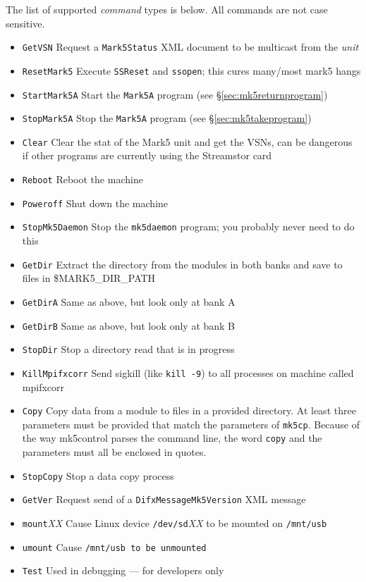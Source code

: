 The list of supported {\em command} types is below.
All commands are not case sensitive.
\begin{itemize}
\item {\tt GetVSN} Request a {\tt Mark5Status} XML document to be multicast from the {\em unit}
\item {\tt ResetMark5} Execute {\tt SSReset} and {\tt ssopen}; this cures many/most mark5 hangs
\item {\tt StartMark5A} Start the {\tt Mark5A} program (see \S\ref{sec:mk5returnprogram})
\item {\tt StopMark5A} Stop the {\tt Mark5A} program (see \S\ref{sec:mk5takeprogram})
\item {\tt Clear} Clear the stat of the Mark5 unit and get the VSNs, can be dangerous if other programs are currently using the Streamstor card
\item {\tt Reboot} Reboot the machine
\item {\tt Poweroff} Shut down the machine
\item {\tt StopMk5Daemon} Stop the {\tt mk5daemon} program; you probably never need to do this
\item {\tt GetDir} Extract the directory from the modules in both banks and save to files in \$MARK5\_DIR\_PATH
\item {\tt GetDirA} Same as above, but look only at bank A
\item {\tt GetDirB} Same as above, but look only at bank B
\item {\tt StopDir} Stop a directory read that is in progress
\item {\tt KillMpifxcorr} Send sigkill (like {\tt kill -9}) to all processes on machine called mpifxcorr
\item {\tt Copy} Copy data from a module to files in a provided directory.
At least three parameters must be provided that match the parameters of {\tt mk5cp}.
Because of the way mk5control parses the command line, the word {\tt copy} and the parameters must all be enclosed in quotes.
\item {\tt StopCopy} Stop a data copy process
\item {\tt GetVer} Request send of a {\tt DifxMessageMk5Version} XML message
\item {\tt mount}{\em XX} Cause Linux device {\tt /dev/sd}{\em XX} to be mounted on {\tt /mnt/usb}
\item {\tt umount} Cause {\tt /mnt/usb to be unmounted}
\item {\tt Test} Used in debugging --- for developers only
\end{itemize}







